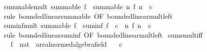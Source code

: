 \begin{isabellebody}
\endisatagproof
{\isafoldproof}%
%
\isadelimproof
\isanewline
%
\endisadelimproof
\isanewline
{}\isamarkupfalse%
\ summable{\isacharunderscore}{\kern0pt}mult{}{\isacharcolon}{\kern0pt}\ {\isachardoublequoteopen}summable\ f\ {\isasymLongrightarrow}\ summable\ {\isacharparenleft}{\kern0pt}{\isasymlambda}n{\isachardot}{\kern0pt}\ f\ n\ {\isacharasterisk}{\kern0pt}\ c{\isacharparenright}{\kern0pt}{\isachardoublequoteclose}\isanewline
%
\isadelimproof
\ \ %
\endisadelimproof
%
\isatagproof
{}\isamarkupfalse%
\ {\isacharparenleft}{\kern0pt}rule\ bounded{\isacharunderscore}{\kern0pt}linear{\isachardot}{\kern0pt}summable\ {\isacharbrackleft}{\kern0pt}OF\ bounded{\isacharunderscore}{\kern0pt}linear{\isacharunderscore}{\kern0pt}mult{\isacharunderscore}{\kern0pt}left{\isacharbrackright}{\kern0pt}{\isacharparenright}{\kern0pt}%
\endisatagproof
{\isafoldproof}%
%
\isadelimproof
\isanewline
%
\endisadelimproof
\isanewline
{}\isamarkupfalse%
\ suminf{\isacharunderscore}{\kern0pt}mult{}{\isacharcolon}{\kern0pt}\ {\isachardoublequoteopen}summable\ f\ {\isasymLongrightarrow}\ suminf\ f\ {\isacharasterisk}{\kern0pt}\ c\ {\isacharequal}{\kern0pt}\ {\isacharparenleft}{\kern0pt}{\isasymSum}n{\isachardot}{\kern0pt}\ f\ n\ {\isacharasterisk}{\kern0pt}\ c{\isacharparenright}{\kern0pt}{\isachardoublequoteclose}\isanewline
%
\isadelimproof
\ \ %
\endisadelimproof
%
\isatagproof
{}\isamarkupfalse%
\ {\isacharparenleft}{\kern0pt}rule\ bounded{\isacharunderscore}{\kern0pt}linear{\isachardot}{\kern0pt}suminf\ {\isacharbrackleft}{\kern0pt}OF\ bounded{\isacharunderscore}{\kern0pt}linear{\isacharunderscore}{\kern0pt}mult{\isacharunderscore}{\kern0pt}left{\isacharbrackright}{\kern0pt}{\isacharparenright}{\kern0pt}%
\endisatagproof
{\isafoldproof}%
%
\isadelimproof
\isanewline
%
\endisadelimproof
\isanewline
{}\isamarkupfalse%
\isanewline
\isanewline
{}\isamarkupfalse%
\ sums{\isacharunderscore}{\kern0pt}mult{\isacharunderscore}{\kern0pt}iff{\isacharcolon}{\kern0pt}\isanewline
\ \ \ f\ {\isacharcolon}{\kern0pt}{\isacharcolon}{\kern0pt}\ {\isachardoublequoteopen}nat\ {\isasymRightarrow}\ {\isacharprime}{\kern0pt}a{\isacharcolon}{\kern0pt}{\isacharcolon}{\kern0pt}{\isacharbraceleft}{\kern0pt}real{\isacharunderscore}{\kern0pt}normed{\isacharunderscore}{\kern0pt}algebra{\isacharcomma}{\kern0pt}field{\isacharbraceright}{\kern0pt}{\isachardoublequoteclose}\isanewline
\ \ \ {\isachardoublequoteopen}c\ {\isasymnoteq}\ {}{\isachardoublequoteclose}\isanewline

\end{isabellebody}
